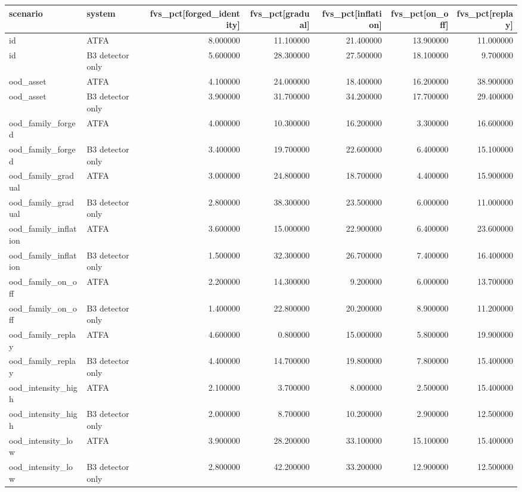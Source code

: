 \begin{tabular}{llrrrrr}
\toprule
scenario & system & fvs\_pct[forged\_identity] & fvs\_pct[gradual] & fvs\_pct[inflation] & fvs\_pct[on\_off] & fvs\_pct[replay] \\
\midrule
id & ATFA & 8.000000 & 11.100000 & 21.400000 & 13.900000 & 11.000000 \\
id & B3 detector only & 5.600000 & 28.300000 & 27.500000 & 18.100000 & 9.700000 \\
ood\_asset & ATFA & 4.100000 & 24.000000 & 18.400000 & 16.200000 & 38.900000 \\
ood\_asset & B3 detector only & 3.900000 & 31.700000 & 34.200000 & 17.700000 & 29.400000 \\
ood\_family\_forged & ATFA & 4.000000 & 10.300000 & 16.200000 & 3.300000 & 16.600000 \\
ood\_family\_forged & B3 detector only & 3.400000 & 19.700000 & 22.600000 & 6.400000 & 15.100000 \\
ood\_family\_gradual & ATFA & 3.000000 & 24.800000 & 18.700000 & 4.400000 & 15.900000 \\
ood\_family\_gradual & B3 detector only & 2.800000 & 38.300000 & 23.500000 & 6.000000 & 11.000000 \\
ood\_family\_inflation & ATFA & 3.600000 & 15.000000 & 22.900000 & 6.400000 & 23.600000 \\
ood\_family\_inflation & B3 detector only & 1.500000 & 32.300000 & 26.700000 & 7.400000 & 16.400000 \\
ood\_family\_on\_off & ATFA & 2.200000 & 14.300000 & 9.200000 & 6.000000 & 13.700000 \\
ood\_family\_on\_off & B3 detector only & 1.400000 & 22.800000 & 20.200000 & 8.900000 & 11.200000 \\
ood\_family\_replay & ATFA & 4.600000 & 0.800000 & 15.000000 & 5.800000 & 19.900000 \\
ood\_family\_replay & B3 detector only & 4.400000 & 14.700000 & 19.800000 & 7.800000 & 15.400000 \\
ood\_intensity\_high & ATFA & 2.100000 & 3.700000 & 8.000000 & 2.500000 & 15.400000 \\
ood\_intensity\_high & B3 detector only & 2.000000 & 8.700000 & 10.200000 & 2.900000 & 12.500000 \\
ood\_intensity\_low & ATFA & 3.900000 & 28.200000 & 33.100000 & 15.100000 & 15.400000 \\
ood\_intensity\_low & B3 detector only & 2.800000 & 42.200000 & 33.200000 & 12.900000 & 12.500000 \\
\bottomrule
\end{tabular}
